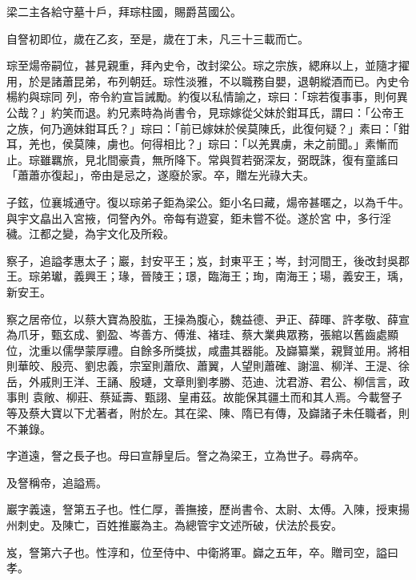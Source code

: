 \begin{pinyinscope}
 梁二主各給守墓十戶，拜琮柱國，賜爵莒國公。



 自詧初即位，歲在乙亥，至是，歲在丁未，凡三十三載而亡。



 琮至煬帝嗣位，甚見親重，拜內史令，改封梁公。琮之宗族，緦麻以上，並隨才擢用，於是諸蕭昆弟，布列朝廷。琮性淡雅，不以職務自嬰，退朝縱酒而已。內史令楊約與琮同
 列，帝令約宣旨誡勵。約復以私情諭之，琮曰：「琮若復事事，則何異公哉？」約笑而退。約兄素時為尚書令，見琮嫁從父妹於鉗耳氏，謂曰：「公帝王之族，何乃適妹鉗耳氏？」琮曰：「前已嫁妹於侯莫陳氏，此復何疑？」素曰：「鉗耳，羌也，侯莫陳，虜也。何得相比？」琮曰：「以羌異虜，未之前聞。」素慚而止。琮雖羈旅，見北間豪貴，無所降下。常與賀若弼深友，弼既誅，復有童謠曰「蕭蕭亦復起」，帝由是忌之，遂廢於家。卒，贈左光祿大夫。



 子鉉，位襄城通守。復以琮弟子鉅為梁公。鉅小名曰藏，煬帝甚暱之，以為千牛。與宇文皛出入宮掖，伺詧內外。帝每有遊宴，鉅未嘗不從。遂於宮
 中，多行淫穢。江都之變，為宇文化及所殺。



 察子，追謚孝惠太子；巖，封安平王；岌，封東平王；岑，封河間王，後改封吳郡王。琮弟瓛，義興王；瑑，晉陵王；璟，臨海王；珣，南海王；瑒，義安王，瑀，新安王。



 察之居帝位，以蔡大寶為股肱，王操為腹心，魏益德、尹正、薛暉、許孝敬、薛宣為爪牙，甄玄成、劉盈、岑善方、傅淮、褚珪、蔡大業典眾務，張綰以舊齒處顯位，沈重以儒學蒙厚禮。自餘多所獎拔，咸盡其器能。及巋纂業，親賢並用。將相則華皎、殷亮、劉忠義，宗室則蕭欣、蕭翼，人望則蕭確、謝溫、柳洋、王湜、徐岳，外戚則王洋、王誦、殷璉，文章則劉孝勝、范迪、沈君游、君公、柳信言，政事則
 袁敞、柳莊、蔡延壽、甄詡、皇甫茲。故能保其疆土而和其人焉。今載詧子等及蔡大寶以下尤著者，附於左。其在梁、陳、隋已有傳，及巋諸子未任職者，則不兼錄。



 字道遠，詧之長子也。母曰宣靜皇后。詧之為梁王，立為世子。尋病卒。



 及詧稱帝，追謚焉。



 巖字義遠，詧第五子也。性仁厚，善撫接，歷尚書令、太尉、太傅。入陳，授東揚州刺史。及陳亡，百姓推巖為主。為總管宇文述所破，伏法於長安。



 岌，詧第六子也。性淳和，位至侍中、中衛將軍。巋之五年，卒。贈司空，謚曰孝。




\end{pinyinscope}
